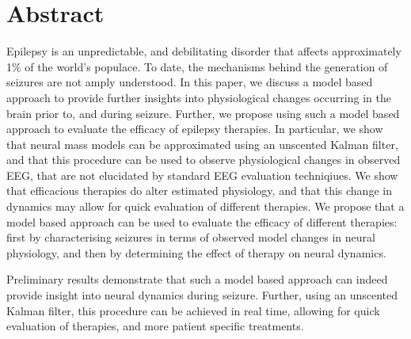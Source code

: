 \section{Abstract}

Epilepsy is an unpredictable, and debilitating disorder that affects approximately 1\% of the world's populace. To date, the mechanisms behind the generation of seizures are not amply understood. In this paper, we discuss a model based approach to provide further insights into physiological changes occurring in the brain prior to, and during seizure. Further, we propose using such a model based approach to evaluate the efficacy of epilepsy therapies. In particular, we show that neural mass models can be approximated using an unscented Kalman filter, and that this procedure can be used to observe physiological changes in observed EEG, that are not elucidated by standard EEG evaluation techniqiues. We show that efficacious therapies do alter estimated physiology, and that this change in dynamics may allow for quick evaluation of different therapies. We propose that a model based approach can be used to evaluate the efficacy of different therapies: first by characterising seizures in terms of observed model changes in neural physiology, and then by determining the effect of therapy on neural dynamics.

Preliminary results demonstrate that such a model based approach can indeed provide insight into neural dynamics during seizure. Further, using an unscented Kalman filter, this procedure can be achieved in real time, allowing for quick evaluation of therapies, and more patient specific treatments.
